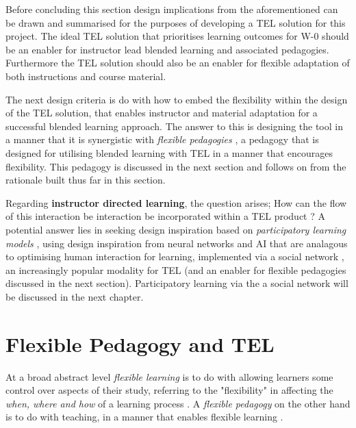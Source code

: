 Before concluding this section design implications from the aforementioned can be drawn and summarised for the purposes of developing a TEL solution for this project. The ideal TEL solution that prioritises learning outcomes for W-0 should be an enabler for instructor lead blended learning and associated pedagogies. Furthermore the TEL solution should also be an enabler for flexible adaptation of both instructions and course material.

The next design criteria is do with how to embed the flexibility within the design of the TEL solution, that enables instructor and material adaptation for a successful blended learning approach. The answer to this is designing the tool in a manner that it is synergistic with \textit{flexible pedagogies} \cite{Gordon2014,Burge2011}, a pedagogy that is designed for utilising blended learning with TEL in a manner that encourages flexibility. This pedagogy is discussed in the next section and follows on from the rationale built thus far in this section.

Regarding \textbf{instructor directed learning}, the question arises; How can the flow of this interaction be interaction be incorporated within a TEL product ? A potential answer lies in seeking design inspiration based on  \textit{participatory learning models} \cite{Yager1990,Yager2004}, using design inspiration from neural networks and AI  that are analagous to optimising human interaction for learning, implemented via a social network \cite{Gordon2014,Burge2011}, an increasingly popular modality for TEL (and an enabler for flexible pedagogies discussed in the next section). Participatory learning via the a social network will be discussed in the next chapter.


\newpage

\section{Flexible Pedagogy and TEL}

At a broad abstract level \textit{flexible learning} is to do with allowing learners some control over aspects of their study, referring to the "flexibility" in affecting the \textit{when, where and how} of a learning process \cite{Gordon2014,Burge2011}. A \textit{flexible pedagogy} on the other hand is to do with teaching, in a manner that enables flexible learning \cite{Gordon2014}.

